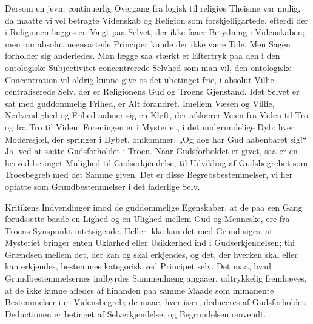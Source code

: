 \documentclass[12pt]{book}
\begin{document}
Dersom en jevn, continuerlig Overgang fra logisk til religiøs
Theisme var mulig, da maatte vi vel betragte Videnskab og Religion
som forskjelligartede, efterdi der
i Religionen lægges en Vægt paa Selvet, der ikke faaer Betydning i
Videnskaben; men om absolut ueensartede Principer kunde der ikke
være Tale. Men Sagen forholder sig anderledes. Man lægge saa stærkt
et Eftertryk paa den i den ontologiske Subjectivitet concentrerede
Selvhed som man vil, den ontologiske Concentration vil aldrig kunne
give os det ubetinget frie, i absolut Villie centraliserede Selv,
der er Religionens Gud og Troens Gjenstand. Idet Selvet er sat med
guddommelig Frihed, er Alt forandret. Imellem Væsen og Villie,
Nødvendighed og Frihed aabner sig en Kløft, der afskærer Veien fra
Viden til Tro og fra Tro til Viden: Foreningen er i Mysteriet, i det
uudgrundelige Dyb: hver Moderssjæl, der springer i Dybet, omkommer.
„Og dog har Gud aabenbaret sig!“ Ja, ved at sætte Gudsforholdet i
Troen. Naar Gudsforholdet er givet, saa er en herved betinget
Mulighed til Gudserkjendelse, til Udvikling af Gudsbegrebet som
Troesbegreb med det Samme given. Det er disse Begrebsbestemmelser,
vi her opfatte som Grundbestemmelser i det faderlige Selv.

Kritikens Indvendinger imod de guddommelige Egenskaber, at de paa
een Gang forudsætte baade en Lighed og en Ulighed mellem Gud og
Menneske, ere fra Troens Synspunkt intetsigende. Heller ikke kan det
med Grund siges, at Mysteriet bringer enten Uklarhed eller
Usikkerhed ind i Gudserkjendelsen; thi Grændsen mellem det, der kan
og skal erkjendes, og det, der hverken skal eller kan erkjendes,
bestemmes kategorisk ved Principet selv. Det maa, hvad
Grundbestemmelsernes indbyrdes Sammenhæng angaaer, udtrykkelig
fremhæves, at de ikke kunne afledes af hinanden paa samme Maade som
immanente Bestemmelser i et Vidensbegreb; de maae, hver især,
deduceres af Gudsforholdet; Deductionen er betinget af
Selverkjendelse, og Begrundelsen omvendt.
\end{document}
